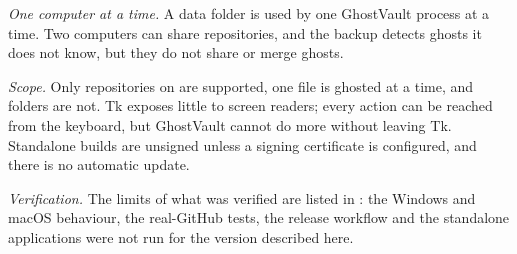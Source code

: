 \emph{One computer at a time.} A data folder is used by one GhostVault process at a time. Two
computers can share repositories, and the backup detects ghosts it does not know, but they do not
share or merge ghosts.

\emph{Scope.} Only repositories on  are supported, one file is ghosted at a time,
and folders are not. Tk exposes little to screen readers; every action can be reached from the
keyboard, but GhostVault cannot do more without leaving Tk. Standalone builds are unsigned unless a
signing certificate is configured, and there is no automatic update.

\emph{Verification.} The limits of what was verified are listed in : the Windows
and macOS behaviour, the real-GitHub tests, the release workflow and the standalone applications were
not run for the version described here.
